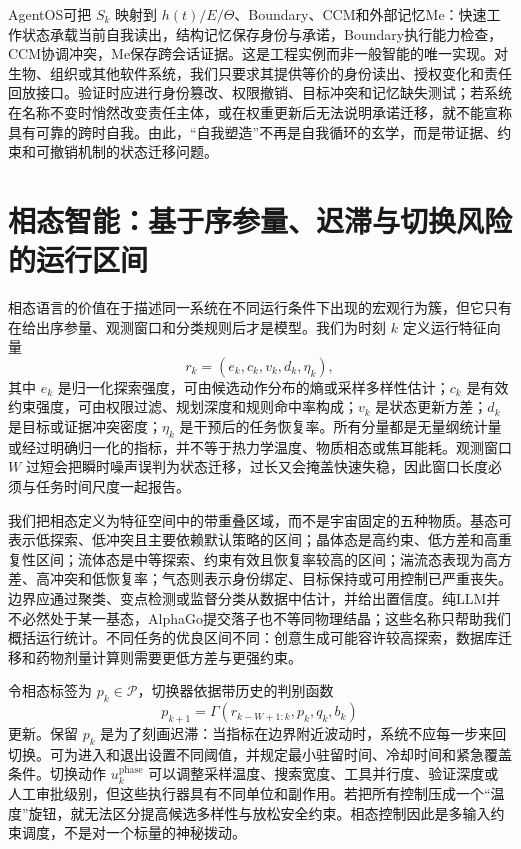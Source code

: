 AgentOS可把 $S_k$ 映射到 $h(t)/E/\Theta$、Boundary、CCM和外部记忆Me：快速工作状态承载当前自我读出，结构记忆保存身份与承诺，Boundary执行能力检查，CCM协调冲突，Me保存跨会话证据。这是工程实例而非一般智能的唯一实现。对生物、组织或其他软件系统，我们只要求其提供等价的身份读出、授权变化和责任回放接口。验证时应进行身份篡改、权限撤销、目标冲突和记忆缺失测试；若系统在名称不变时悄然改变责任主体，或在权重更新后无法说明承诺迁移，就不能宣称具有可靠的跨时自我。由此，“自我塑造”不再是自我循环的玄学，而是带证据、约束和可撤销机制的状态迁移问题。

\section{相态智能：基于序参量、迟滞与切换风险的运行区间}
\label{sec:cpd_phase_theory}

相态语言的价值在于描述同一系统在不同运行条件下出现的宏观行为簇，但它只有在给出序参量、观测窗口和分类规则后才是模型。我们为时刻 $k$ 定义运行特征向量
\[
 r_k=(e_k,c_k,v_k,d_k,\eta_k),
\]
其中 $e_k$ 是归一化探索强度，可由候选动作分布的熵或采样多样性估计；$c_k$ 是有效约束强度，可由权限过滤、规划深度和规则命中率构成；$v_k$ 是状态更新方差；$d_k$ 是目标或证据冲突密度；$\eta_k$ 是干预后的任务恢复率。所有分量都是无量纲统计量或经过明确归一化的指标，并不等于热力学温度、物质相态或焦耳能耗。观测窗口 $W$ 过短会把瞬时噪声误判为状态迁移，过长又会掩盖快速失稳，因此窗口长度必须与任务时间尺度一起报告。

我们把相态定义为特征空间中的带重叠区域，而不是宇宙固定的五种物质。基态可表示低探索、低冲突且主要依赖默认策略的区间；晶体态是高约束、低方差和高重复性区间；流体态是中等探索、约束有效且恢复率较高的区间；湍流态表现为高方差、高冲突和低恢复率；气态则表示身份绑定、目标保持或可用控制已严重丧失。边界应通过聚类、变点检测或监督分类从数据中估计，并给出置信度。纯LLM并不必然处于某一基态，AlphaGo提交落子也不等同物理结晶；这些名称只帮助我们概括运行统计。不同任务的优良区间不同：创意生成可能容许较高探索，数据库迁移和药物剂量计算则需要更低方差与更强约束。

令相态标签为 $p_k\in\mathcal{P}$，切换器依据带历史的判别函数
\[
 p_{k+1}=\Gamma(r_{k-W+1:k},p_k,q_k,b_k)
\]
更新。保留 $p_k$ 是为了刻画迟滞：当指标在边界附近波动时，系统不应每一步来回切换。可为进入和退出设置不同阈值，并规定最小驻留时间、冷却时间和紧急覆盖条件。切换动作 $u_k^{\mathrm{phase}}$ 可以调整采样温度、搜索宽度、工具并行度、验证深度或人工审批级别，但这些执行器具有不同单位和副作用。若把所有控制压成一个“温度”旋钮，就无法区分提高候选多样性与放松安全约束。相态控制因此是多输入约束调度，不是对一个标量的神秘拨动。

